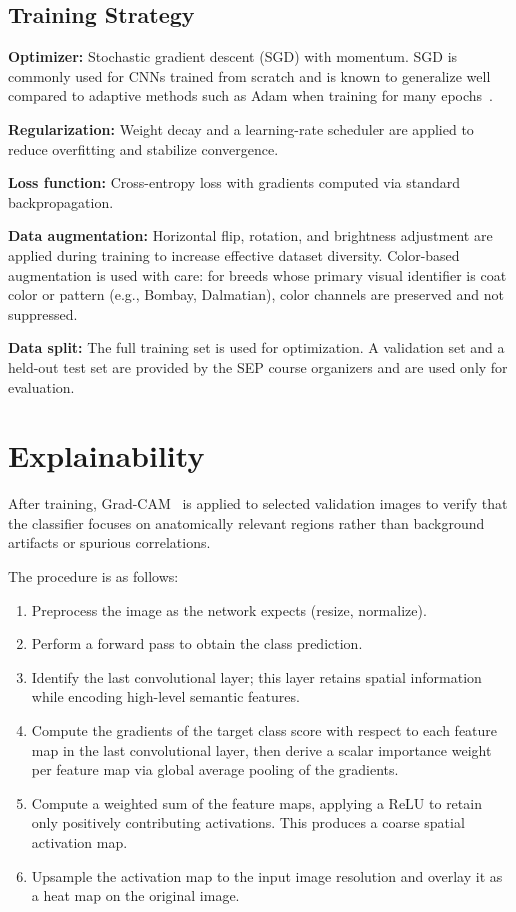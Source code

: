 \documentclass[10pt,twocolumn,letterpaper]{article}
\begin{document}
\subsection{Training Strategy}

\textbf{Optimizer:} Stochastic gradient descent (SGD) with momentum. SGD is commonly used for CNNs trained from scratch and is known to generalize well compared to adaptive methods such as Adam when training for many epochs~\cite{vgg16_github}.

\textbf{Regularization:} Weight decay and a learning-rate scheduler are applied to reduce overfitting and stabilize convergence.

\textbf{Loss function:} Cross-entropy loss with gradients computed via standard backpropagation.

\textbf{Data augmentation:} Horizontal flip, rotation, and brightness adjustment are applied during training to increase effective dataset diversity. Color-based augmentation is used with care: for breeds whose primary visual identifier is coat color or pattern (e.g., Bombay, Dalmatian), color channels are preserved and not suppressed.

\textbf{Data split:} The full training set is used for optimization. A validation set and a held-out test set are provided by the SEP course organizers and are used only for evaluation.

\section{Explainability}
\label{sec:explainability}

After training, Grad-CAM~\cite{gradcam_matlab} is applied to selected validation images to verify that the classifier focuses on anatomically relevant regions rather than background artifacts or spurious correlations.

The procedure is as follows:

\begin{enumerate}[leftmargin=*, topsep=2pt, itemsep=2pt]
  \item Preprocess the image as the network expects (resize, normalize).
  \item Perform a forward pass to obtain the class prediction.
  \item Identify the last convolutional layer; this layer retains spatial information while encoding high-level semantic features.
  \item Compute the gradients of the target class score with respect to each feature map in the last convolutional layer, then derive a scalar importance weight per feature map via global average pooling of the gradients.
  \item Compute a weighted sum of the feature maps, applying a ReLU to retain only positively contributing activations. This produces a coarse spatial activation map.
  \item Upsample the activation map to the input image resolution and overlay it as a heat map on the original image.
\end{enumerate}
\end{document}
